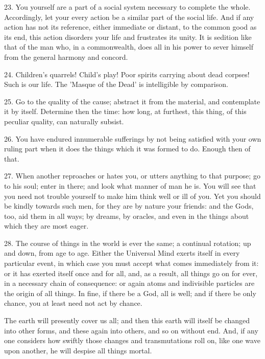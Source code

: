 \documentclass{book}
\begin{document}
23. You yourself are a part of a social system necessary to complete
the whole. Accordingly, let your every action be a similar part of the
social life. And if any action has not its reference, either immediate
or distant, to the common good as its end, this action disorders your
life and frustrates its unity. It is sedition like that of the man
who, in a commonwealth, does all in his power to sever himself from
the general harmony and concord.

24. Children's quarrels! Child's play! Poor spirits carrying about
dead corpses! Such is our life. The 'Masque of the Dead' is
intelligible by comparison.

25. Go to the quality of the cause; abstract it from the material, and
contemplate it by itself. Determine then the time: how long, at
furthest, this thing, of this peculiar quality, can naturally subsist.

26. You have endured innumerable sufferings by not being satisfied
with your own ruling part when it does the things which it was formed
to do. Enough then of that.

27. When another reproaches or hates you, or utters anything to that
purpose; go to his soul; enter in there; and look what manner of man
he is. You will see that you need not trouble yourself to make him
think well or ill of you. Yet you should be kindly towards such men,
for they are by nature your friends: and the Gods, too, aid them in
all ways; by dreams, by oracles, and even in the things about which
they are most eager.

28. The course of things in the world is ever the same; a continual
rotation; up and down, from age to age. Either the Universal Mind
exerts itself in every particular event, in which case you must accept
what comes immediately from it: or it has exerted itself once and for
all, and, as a result, all things go on for ever, in a necessary chain
of consequence: or again atoms and indivisible particles are the
origin of all things. In fine, if there be a God, all is well; and if
there be only chance, you at least need not act by chance.

The earth will presently cover us all; and then this earth will itself
be changed into other forms, and these again into others, and so on
without end. And, if any one considers how swiftly those changes and
transmutations roll on, like one wave upon another, he will despise
all things mortal.
\end{document}
